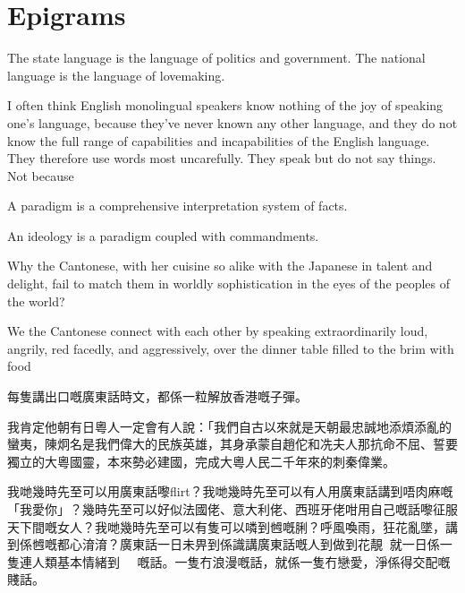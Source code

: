 


\chapter{Epigrams}
The state language is the language of politics and government. The national language is the language of lovemaking.

\separator

I often think English monolingual speakers know nothing of the joy of speaking one’s language, because they’ve never known any other language, and they do not know the full range of capabilities and incapabilities of the English language. They therefore use words most uncarefully. They speak but do not say things. Not because

\separator

A paradigm is a comprehensive interpretation system of facts.

An ideology is a paradigm coupled with commandments.

\separator


Why the Cantonese, with her cuisine so alike with the Japanese in talent and delight, fail to match them in worldly sophistication in the eyes of the peoples of the world?

\separator

We the Cantonese connect with each other by speaking extraordinarily loud, angrily, red facedly, and aggressively, over the dinner table filled to the brim with food


\separator

每隻講出口嘅廣東話時文，都係一粒解放香港嘅子彈。

\separator

我肯定他朝有日粵人一定會有人說：「我們自古以來就是天朝最忠誠地添煩添亂的蠻夷，陳炯名是我們偉大的民族英雄，其身承蒙自趙佗和冼夫人那抗命不屈、誓要獨立的大粵國靈，本來勢必建國，完成大粵人民二千年來的刺秦偉業。

\separator

我哋幾時先至可以用廣東話嚟flirt？我哋幾時先至可以有人用廣東話講到唔肉麻嘅「我愛你」？幾時先至可以好似法國佬、意大利佬、西班牙佬咁用自己嘅話嚟征服天下間嘅女人？我哋幾時先至可以有隻可以噒到乸嘅脷？呼風喚雨，狂花亂墜，講到係乸嘅都心淯淯？廣東話一日未畀到係識講廣東話嘅人到做到花靚，就一日係一隻連人類基本情緒到𠄡嘅話。一隻冇浪漫嘅話，就係一隻冇戀愛，淨係得交配嘅賤話。